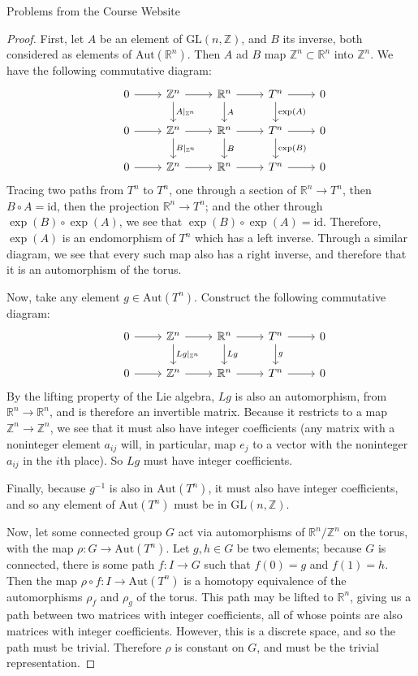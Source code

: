 \documentclass[12pt]{article}
\newcommand{\Z}{\mathbb{Z}}
\newcommand{\R}{\mathbb{R}}
\theoremstyle{definition}
\newenvironment{problem}[2][Problem]{\begin{trivlist}
\item[\hskip \labelsep {\bfseries #1}\hskip \labelsep {\bfseries #2.}]}{\end{trivlist}}
\begin{document}
\begin{section}{Problems from the Course Website}
\begin{problem}{6}
\begin{proof}
			\par First, let $A$ be an element of $\text{GL}(n,\Z)$, and $B$ its inverse, both considered as elements of $\text{Aut}(\R^n)$. Then $A$ ad $B$ map $\Z^n \subset \R^n$ into $\Z^n$.  We have the following commutative diagram:
			\[\begin{tikzcd}
					&0 \arrow[r, ""] & \Z^n \arrow[r ] \arrow[d,"A \lvert_{\Z^n}"]& \R^n \arrow[r] \arrow[d, "A"] & T^n \arrow[d, "\text{exp}(A)"]\arrow[r] & 0\\&0 \arrow[r, ""] & \Z^n \arrow[r ] \arrow[d,"B \lvert_{\Z^n}"]& \R^n \arrow[r] \arrow[d, "B"] & T^n \arrow[d, "\text{exp}(B)"]\arrow[r] & 0\\
					&0 \arrow[r]& \Z^n \arrow[r]& \R^n \arrow[r]& T^n\arrow[r] & 0
			\end{tikzcd}\]
			Tracing two paths from $T^n$ to $T^n$, one through a section of $\R^n \to T^n$, then $B \circ A = \text{id}$, then the projection $\R^n \to T^n$; and the other through $\exp(B) \circ \exp(A)$, we see that $\exp(B) \circ \exp(A) = \text{id}$. Therefore, $\exp(A)$ is an endomorphism of $T^n$ which has a left inverse. Through a similar diagram, we see that every such map also has a right inverse, and therefore that it is an automorphism of the torus.
			\par Now, take any element $g \in \text{Aut}(T^n)$. Construct the following commutative diagram:
		    \[\begin{tikzcd}
					&0 \arrow[r, ""] & \Z^n \arrow[r ] \arrow[d,"Lg \rvert_{\Z^n}"]& \R^n \arrow[r] \arrow[d, "Lg"] & T^n \arrow[d, "g"]\arrow[r] & 0\\&0 \arrow[r, ""] & \Z^n \arrow[r ] & \R^n \arrow[r] & T^n \arrow[r] & 0
			\end{tikzcd}\]
            By the lifting property of the Lie algebra, $Lg$ is also an automorphism, from $\R^n \to \R^n$, and is therefore an invertible matrix. Because it restricts to a map $\Z^n \to \Z^n$, we see that it must also have integer coefficients (any matrix with a noninteger element $a_{ij}$ will, in particular, map $e_j$ to a vector with the noninteger $a_{ij}$ in the $i$th place). So $Lg$ must have integer coefficients. 
            \par Finally, because $g^{-1}$ is also in $\text{Aut}(T^n)$, it must also have integer coefficients, and so any element of $\text{Aut}(T^n)$ must be in $\text{GL}(n,\Z)$.
            \par Now, let some connected group $G$ act via automorphisms of $\R^n/\Z^n$ on the torus, with the map $\rho : G \to \text{Aut}(T^n)$. Let $g,h \in G$ be two elements; because $G$ is connected, there is some path $f : I \to G$ such that $f(0) = g$ and $f(1) = h$. Then the map $\rho \circ f : I \to \text{Aut}(T^n)$ is a homotopy equivalence of the automorphisms $\rho_f$ and $\rho_g$ of the torus. This path may be lifted to $\R^n$, giving us a path between two matrices with integer coefficients, all of whose points are also matrices with integer coefficients. However, this is a discrete space, and so the path must be trivial. Therefore $\rho$ is constant on $G$, and must be the trivial representation.

\end{proof}
\end{problem}
\end{section}
\end{document}
